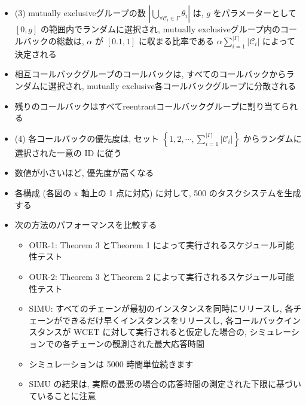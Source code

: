 \begin{frame}{}
    \begin{itemize}
        \item (3) mutually exclusiveグループの数 $\left|\bigcup_{\forall \mathcal{C}_{i} \in \Gamma} \theta_{i}\right|$ は, $g$ をパラメーターとして $[0, g]$ の範囲内でランダムに選択され, mutually exclusiveグループ内のコールバックの総数は, $\alpha$ が $[0.1,1]$ に収まる比率である $\alpha \sum_{i=1}^{|\Gamma|}\left|\mathcal{C}_{i}\right|$ によって決定される
\item 相互コールバックグループのコールバックは, すべてのコールバックからランダムに選択され, mutually exclusive各コールバックグループに分散される
\item 残りのコールバックはすべてreentrantコールバックグループに割り当てられる
\item (4) 各コールバックの優先度は, セット $\left\{1,2, \cdots, \sum_{i=1}^{|\Gamma|}\left|\mathcal{C}_{i}\right|\right\}$ からランダムに選択された一意の ID に従う
\item 数値が小さいほど, 優先度が高くなる
    \end{itemize}
\end{frame}

\begin{frame}{}
    \begin{itemize}
        \item 各構成 (各図の $\mathrm{x}$ 軸上の 1 点に対応) に対して, 500 のタスクシステムを生成する
\item 次の方法のパフォーマンスを比較する
              \begin{itemize}
                  \item  OUR-1: Theorem 3 とTheorem 1 によって実行されるスケジュール可能性テスト

                  \item  OUR-2: Theorem 3 とTheorem 2 によって実行されるスケジュール可能性テスト

                  \item  SIMU: すべてのチェーンが最初のインスタンスを同時にリリースし, 各チェーンができるだけ早くインスタンスをリリースし, 各コールバックインスタンスが WCET に対して実行されると仮定した場合の, シミュレーションでの各チェーンの観測された最大応答時間
\item シミュレーションは 5000 時間単位続きます
\item SIMU の結果は, 実際の最悪の場合の応答時間の測定された下限に基づいていることに注意

              \end{itemize}
    \end{itemize}
\end{frame}


